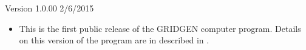 \item Version 1.0.00 2/6/2015
\begin{itemize}[label=--]
  \item This is the first public release of the GRIDGEN computer program. Details on this version of the program are in described in \citet{lien2015gridgen}.
\end{itemize}

